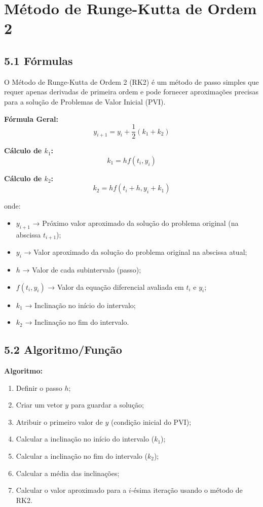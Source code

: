 \chapter{Método de Runge-Kutta de Ordem 2}

\section*{5.1 Fórmulas}

O Método de Runge-Kutta de Ordem 2 (RK2) é um método de passo simples que requer apenas derivadas de primeira ordem e pode fornecer aproximações precisas para a solução de Problemas de Valor Inicial (PVI).

\textbf{Fórmula Geral:}
\begin{equation}
y_{i+1} = y_i + \frac{1}{2}(k_1 + k_2)
\end{equation}

\textbf{Cálculo de $k_1$:}
\begin{equation}
k_1 = h f(t_i, y_i)
\end{equation}

\textbf{Cálculo de $k_2$:}
\begin{equation}
k_2 = h f(t_i + h, y_i + k_1)
\end{equation}

onde:
\begin{itemize}
    \item $y_{i+1}$ → Próximo valor aproximado da solução do problema original (na abscissa $t_{i+1}$);
    \item $y_i$ → Valor aproximado da solução do problema original na abscissa atual;
    \item $h$ → Valor de cada subintervalo (passo);
    \item $f(t_i , y_i)$ → Valor da equação diferencial avaliada em $t_i$ e $y_i$;
    \item $k_1$ → Inclinação no início do intervalo;
    \item $k_2$ → Inclinação no fim do intervalo.
\end{itemize}

\section*{5.2 Algoritmo/Função}

\textbf{Algoritmo:}
\begin{enumerate}
    \item Definir o passo $h$;
    \item Criar um vetor $y$ para guardar a solução;
    \item Atribuir o primeiro valor de $y$ (condição inicial do PVI);
    \item Calcular a inclinação no início do intervalo ($k_1$);
    \item Calcular a inclinação no fim do intervalo ($k_2$);
    \item Calcular a média das inclinações;
    \item Calcular o valor aproximado para a $i$-ésima iteração usando o método de RK2.
\end{enumerate}

